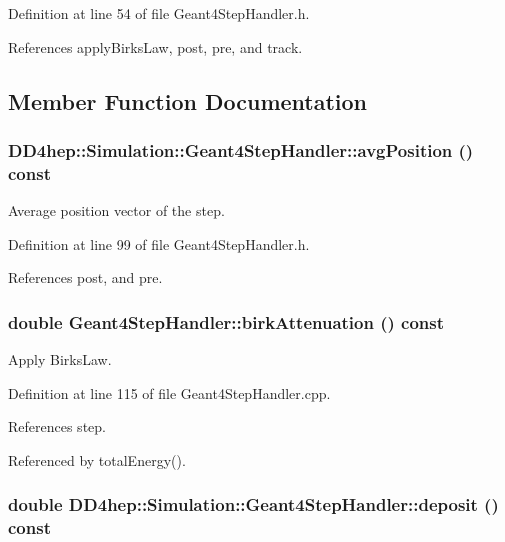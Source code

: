 Definition at line 54 of file Geant4StepHandler.h.

References applyBirksLaw, post, pre, and track.

\subsection{Member Function Documentation}
\hypertarget{class_d_d4hep_1_1_simulation_1_1_geant4_step_handler_a4d4f10349d7e13492f237f88c9b47fc3}{
\subsubsection[{avgPosition}]{ DD4hep::Simulation::Geant4StepHandler::avgPosition () const}}
\label{class_d_d4hep_1_1_simulation_1_1_geant4_step_handler_a4d4f10349d7e13492f237f88c9b47fc3}


Average position vector of the step. 

Definition at line 99 of file Geant4StepHandler.h.

References post, and pre.\hypertarget{class_d_d4hep_1_1_simulation_1_1_geant4_step_handler_a35dae8faec24cfac1914db2e73c55bb2}{
\subsubsection[{birkAttenuation}]{\setlength{\rightskip}{0pt plus 5cm}double Geant4StepHandler::birkAttenuation () const}}
\label{class_d_d4hep_1_1_simulation_1_1_geant4_step_handler_a35dae8faec24cfac1914db2e73c55bb2}


Apply BirksLaw. 

Definition at line 115 of file Geant4StepHandler.cpp.

References step.

Referenced by totalEnergy().\hypertarget{class_d_d4hep_1_1_simulation_1_1_geant4_step_handler_a35ffa3abf0d0d88425b1e6bb0f686d97}{
\subsubsection[{deposit}]{\setlength{\rightskip}{0pt plus 5cm}double DD4hep::Simulation::Geant4StepHandler::deposit () const}}
\label{class_d_d4hep_1_1_simulation_1_1_geant4_step_handler_a35ffa3abf0d0d88425b1e6bb0f686d97}



